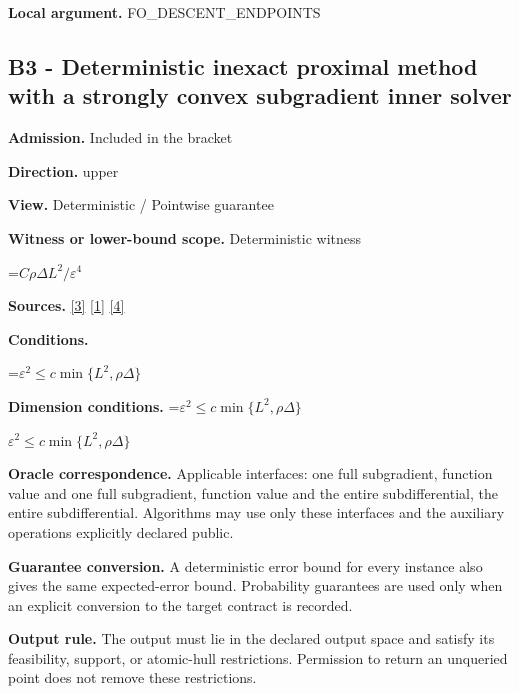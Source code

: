 \documentclass[10pt,a4paper]{article}
\newcommand{\AtlasMath}[1]{\par\begingroup\centering\setbox0=\hbox{$\displaystyle #1$}\ifdim\wd0>1.4\linewidth\typeout{ATLAS WIDE FORMULA: \the\wd0}\fi\ifdim\wd0>\linewidth\resizebox{\linewidth}{!}{\box0}\else\box0\fi\par\endgroup}
\newcommand{\AtlasInlineMath}[1]{\begingroup\setbox0=\hbox{$#1$}\ifdim\wd0>.4\linewidth\endgroup\AtlasMath{#1}\else\endgroup$#1$\fi}
\begin{document}
\textbf{Local argument.} FO\_DESCENT\_ENDPOINTS



\subsection{B3 - Deterministic inexact proximal method with a strongly convex subgradient inner solver}


\textbf{Admission.} Included in the bracket



\textbf{Direction.} upper



\textbf{View.} Deterministic / Pointwise guarantee



\textbf{Witness or lower-bound scope.} Deterministic witness



\AtlasMath{C\rho\Delta L^2/\varepsilon^4}


\textbf{Sources.} \href{https://arxiv.org/pdf/1405.4980}{[3]} \href{https://www2.isye.gatech.edu/~nemirovs/MOR_AccuracyCertificates.pdf}{[1]} \href{https://arxiv.org/pdf/2609.20701}{[4]}



\textbf{Conditions.}
\AtlasMath{\varepsilon^2\le c\min\{L^2,\rho\Delta\}}




\textbf{Dimension conditions.} \AtlasInlineMath{\varepsilon^2\le c\min\{L^2,\rho\Delta\}}



\textbf{Oracle correspondence.} Applicable interfaces: one full subgradient, function value and one full subgradient, function value and the entire subdifferential, the entire subdifferential. Algorithms may use only these interfaces and the auxiliary operations explicitly declared public.



\textbf{Guarantee conversion.} A deterministic error bound for every instance also gives the same expected-error bound. Probability guarantees are used only when an explicit conversion to the target contract is recorded.



\textbf{Output rule.} The output must lie in the declared output space and satisfy its feasibility, support, or atomic-hull restrictions. Permission to return an unqueried point does not remove these restrictions.
\end{document}
